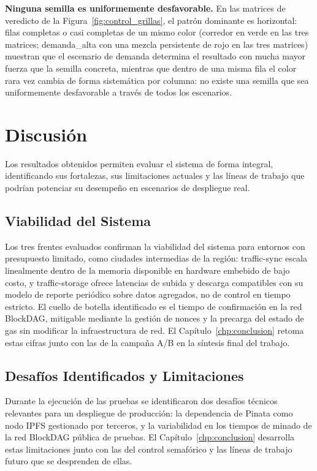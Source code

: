 \textbf{Ninguna semilla es uniformemente desfavorable.} En las matrices de veredicto de la
Figura~\ref{fig:control_grillas}, el patrón dominante es horizontal: filas completas o
casi completas de un mismo color (corredor en verde en las tres matrices; demanda\_alta
con una mezcla persistente de rojo en las tres matrices) muestran que el escenario de
demanda determina el resultado con mucha mayor fuerza que la semilla concreta, mientras
que dentro de una misma fila el color rara vez cambia de forma sistemática por columna:
no existe una semilla que sea uniformemente desfavorable a través de todos los
escenarios.

\section{Discusión}
\label{sec:experimentos_discusion}

Los resultados obtenidos permiten evaluar el sistema de forma integral, identificando
sus fortalezas, sus limitaciones actuales y las líneas de trabajo que podrían
potenciar su desempeño en escenarios de despliegue real.

\subsection{Viabilidad del Sistema}
\label{subsec:discusion_viabilidad}

Los tres frentes evaluados confirman la viabilidad del sistema para entornos con
presupuesto limitado, como ciudades intermedias de la región: traffic-sync escala
linealmente dentro de la memoria disponible en hardware embebido de bajo costo, y
traffic-storage ofrece latencias de subida y descarga compatibles con su modelo de
reporte periódico sobre datos agregados, no de control en tiempo estricto. El cuello de
botella identificado es el tiempo de confirmación en la red BlockDAG, mitigable mediante
la gestión de nonces y la precarga del estado de gas sin modificar la infraestructura de
red. El Capítulo~\ref{chp:conclusion} retoma estas cifras junto con las de la campaña A/B
en la síntesis final del trabajo.

\subsection{Desafíos Identificados y Limitaciones}
\label{subsec:discusion_limitaciones}

Durante la ejecución de las pruebas se identificaron dos desafíos técnicos relevantes
para un despliegue de producción: la dependencia de Pinata como nodo IPFS gestionado por
terceros, y la variabilidad en los tiempos de minado de la red BlockDAG pública de
pruebas. El Capítulo~\ref{chp:conclusion} desarrolla estas limitaciones junto con las del
control semafórico y las líneas de trabajo futuro que se desprenden de ellas.

